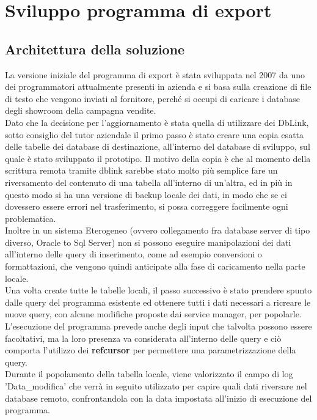 \lstset{
showstringspaces=false
}
\section{Sviluppo programma di export}
\subsection{Architettura della soluzione}
La versione iniziale del programma di export è stata sviluppata nel 2007 da uno dei programmatori attualmente presenti in azienda e si basa sulla creazione di file di testo che vengono inviati al fornitore, perché si occupi di caricare i database degli showroom della campagna vendite.\\
Dato che la decisione per l'aggiornamento è stata quella di utilizzare dei DbLink, sotto consiglio del tutor aziendale il primo passo è stato creare una copia esatta delle tabelle dei database di destinazione, all'interno del database di sviluppo, sul quale è stato sviluppato il prototipo. Il motivo della copia è che al momento della scrittura remota tramite dblink sarebbe stato molto più semplice fare un riversamento del contenuto di una tabella all'interno di un'altra, ed in più in questo modo si ha una versione di backup locale dei dati, in modo che se ci dovessero essere errori nel trasferimento,  si possa correggere facilmente ogni problematica. \\Inoltre in un sistema Eterogeneo (ovvero collegamento fra database server di tipo diverso, Oracle to Sql Server) non si possono eseguire manipolazioni dei dati all'interno delle query di inserimento, come ad esempio conversioni o formattazioni, che vengono quindi anticipate alla fase di caricamento nella parte locale.\\
Una volta create tutte le tabelle locali, il passo successivo è stato prendere spunto dalle query del programma esistente ed ottenere tutti i dati necessari a ricreare le nuove query, con alcune modifiche proposte dai service manager, per popolarle. L'esecuzione del programma prevede anche degli input che talvolta possono essere facoltativi, ma la loro presenza va considerata all'interno delle query e ciò comporta l'utilizzo dei \textbf{refcursor} per permettere una parametrizzazione della query.\\
Durante il popolamento della tabella locale, viene valorizzato il campo di log 'Data\_modifica' che verrà in seguito utilizzato per capire quali dati riversare nel database remoto, confrontandola con la data impostata all'inizio di esecuzione del programma.
\newpage
